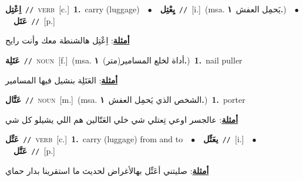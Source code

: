 \documentclass[10pt,a4paper,twoside]{article} %
\begin{document}
\begin{multicols}{2}
{{{{{{{{{{{{\setlength\topsep{0pt}\textbf{\foreignlanguage{arabic}{اِعْتِل}}\ {\color{gray}\texttt{//}\color{black}}\ \textsc{verb}\ [c.]\ \textbf{1.}~carry (luggage)\ \ $\bullet$\ \ \setlength\topsep{0pt}\textbf{\foreignlanguage{arabic}{يِعْتِل}}\ {\color{gray}\texttt{//}\color{black}}\ [i.]\ \color{gray}(msa. \foreignlanguage{arabic}{يَحمِل العفش}~\foreignlanguage{arabic}{\textbf{١.}})\color{black}\ \ $\bullet$\ \ \setlength\topsep{0pt}\textbf{\foreignlanguage{arabic}{عَتَل}}\ {\color{gray}\texttt{//}\color{black}}\ [p.]\  \begin{flushright}\color{gray}\foreignlanguage{arabic}{\textbf{\underline{\foreignlanguage{arabic}{أمثلة}}}: اِعْتِل هالشنطة معك وأنت رايح}\end{flushright}\color{black}} \vspace{2mm}

{\setlength\topsep{0pt}\textbf{\foreignlanguage{arabic}{عَتَلِة}}\ {\color{gray}\texttt{//}\color{black}}\ \textsc{noun}\ [f.]\ \color{gray}(msa. \foreignlanguage{arabic}{أداة لخلع المسامير(متر)}~\foreignlanguage{arabic}{\textbf{١.}})\color{black}\ \textbf{1.}~nail puller\  \begin{flushright}\color{gray}\foreignlanguage{arabic}{\textbf{\underline{\foreignlanguage{arabic}{أمثلة}}}: العَتَلِة بنشيل فيها المسامير}\end{flushright}\color{black}} \vspace{2mm}

{\setlength\topsep{0pt}\textbf{\foreignlanguage{arabic}{عَتَّال}}\ {\color{gray}\texttt{//}\color{black}}\ \textsc{noun}\ [m.]\ \color{gray}(msa. \foreignlanguage{arabic}{الشخص الذي يَحمِل العفش}~\foreignlanguage{arabic}{\textbf{١.}})\color{black}\ \textbf{1.}~porter\  \begin{flushright}\color{gray}\foreignlanguage{arabic}{\textbf{\underline{\foreignlanguage{arabic}{أمثلة}}}: عالجسر اوعي تِعتلي شي خلي العَتّالين هم اللي يشيلو كل شي}\end{flushright}\color{black}} \vspace{2mm}

{\setlength\topsep{0pt}\textbf{\foreignlanguage{arabic}{عَتِّل}}\ {\color{gray}\texttt{//}\color{black}}\ \textsc{verb}\ [c.]\ \textbf{1.}~carry (luggage) from and to\ \ $\bullet$\ \ \setlength\topsep{0pt}\textbf{\foreignlanguage{arabic}{يعَتِّل}}\ {\color{gray}\texttt{//}\color{black}}\ [i.]\ \ $\bullet$\ \ \setlength\topsep{0pt}\textbf{\foreignlanguage{arabic}{عَتَّل}}\ {\color{gray}\texttt{//}\color{black}}\ [p.]\  \begin{flushright}\color{gray}\foreignlanguage{arabic}{\textbf{\underline{\foreignlanguage{arabic}{أمثلة}}}: صليتني أعَتِّل بهالأغراض لحديث ما استقرينا بدار  حماي}\end{flushright}\color{black}} \vspace{2mm}

}}}}}}}}}}}
\end{multicols}
\end{document}
